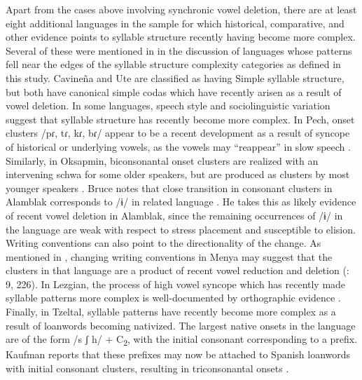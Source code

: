   Apart from the cases above involving synchronic vowel deletion, there are at least eight additional languages in the sample for which historical, comparative, and other evidence points to syllable structure recently having become more complex. Several of these were mentioned in  in the discussion of languages whose patterns fell near the edges of the syllable structure complexity categories as defined in this study. Cavineña and Ute are classified as having Simple syllable structure, but both have canonical simple codas which have recently arisen as a result of vowel deletion. In some languages, speech style and sociolinguistic variation suggest that syllable structure has recently become more complex. In Pech, onset clusters /pɾ, tɾ, kɾ, bɾ/ appear to be a recent development as a result of syncope of historical or underlying vowels, as the vowels may “reappear” in slow speech \citep[20]{Holt1999}. Similarly, in Oksapmin, biconsonantal onset clusters are realized with an intervening schwa for some older speakers, but are produced as clusters by most younger speakers \citep[65-67]{Loughnane2009}. Bruce notes that close transition in consonant clusters in Alamblak corresponds to /ɨ/ in related language \citet[69-70]{Sumariup1984}. He takes this as likely evidence of recent vowel deletion in Alamblak, since the remaining occurrences of /ɨ/ in the language are weak with respect to stress placement and susceptible to elision. Writing conventions can also point to the directionality of the change. As mentioned in , changing writing conventions in Menya may suggest that the clusters in that language are a product of recent vowel reduction and deletion (\citealt{Whitehead2004}: 9, 226). In Lezgian, the process of high vowel syncope which has recently made syllable patterns more complex is well-documented by orthographic evidence \citep[36-8]{Haspelmath1993}. Finally, in Tzeltal, syllable patterns have recently become more complex as a result of loanwords becoming nativized. The largest native onsets in the language are of the form /s ʃ h/ + C\textsubscript{2}, with the initial consonant corresponding to a prefix. Kaufman reports that these prefixes may now be attached to Spanish loanwords with initial consonant clusters, resulting in triconsonantal onsets \citep[14]{Kaufman1971}.



